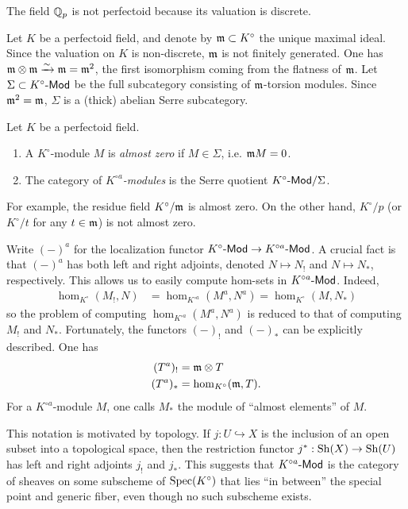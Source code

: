 \documentclass{article}
\begin{document}
\begin{example}
The field $\mathbb{Q}_p$ is not perfectoid because its valuation is discrete. 
\end{example}

Let $K$ be a perfectoid field, and denote by $\mathfrak{m}\subset K^\circ$ the unique 
maximal ideal. Since the valuation on $K$ is non-discrete, $\mathfrak{m}$ is not 
finitely generated. One has $\mathfrak{m}\otimes \mathfrak{m} \xrightarrow\sim \mathfrak{m} = \mathfrak{m}^2$, the 
first isomorphism coming from the flatness of $\mathfrak{m}$. Let 
$\Sigma\subset K^\circ\textnormal{-}\mathsf{Mod}$ be the full subcategory consisting of $\mathfrak{m}$-torsion 
modules. Since $\mathfrak{m}^2=\mathfrak{m}$, $\Sigma$ is a (thick) abelian Serre subcategory. 

\begin{definition} 
Let $K$ be a perfectoid field. 
\begin{enumerate}
  \item A $K^\circ$-module $M$ is \emph{almost zero} if $M\in\Sigma$, i.e. $\mathfrak{m} M=0$. 
  \item The category of \emph{$K^{\circ a}$-modules} is the Serre quotient 
    $K^\circ\textnormal{-}\mathsf{Mod} / \Sigma$. 
\end{enumerate}
\end{definition}

For example, the residue field $K^\circ/\mathfrak{m}$ is almost zero. On the other hand, 
$K^\circ/p$ (or $K^\circ / t$ for any $t\in \mathfrak{m}$) is not almost zero.

Write $(-)^a$ for the localization functor $K^\circ\textnormal{-}\mathsf{Mod} \to K^{\circ a}\textnormal{-}\mathsf{Mod}$. 
A crucial fact is that $(-)^a$ has both left and right adjoints, denoted 
$N\mapsto N_!$ and $N\mapsto N_\ast$, respectively. This allows us to easily 
compute hom-sets in $K^{\circ a}\textnormal{-}\mathsf{Mod}$. Indeed, 
\begin{align*}
  \hom_{K^\circ}(M_!,N) &= \hom_{K^{\circ a}}(M^a,N^a) = \hom_{K^\circ}(M,N_\ast)
\end{align*}
so the problem of computing $\hom_{K^{\circ a}}(M^a,N^a)$ is reduced to that 
of computing $M_!$ and $N_\ast$. Fortunately, the functors $(-)_!$ and 
$(-)_\ast$ can be explicitly described. One has 
\begin{align*}
  (T^a)_! &= \mathfrak{m}\otimes T \\
  (T^a)_\ast &= \hom_{K^\circ}(\mathfrak{m},T) .
\end{align*}
For a $K^{\circ a}$-module $M$, one calls $M_\ast$ the module of ``almost 
elements'' of $M$. 

This notation is motivated by topology. If $j:U\hookrightarrow X$ is the 
inclusion of an open subset into a topological space, then the restriction 
functor $j^\ast:\operatorname{Sh}(X) \to \operatorname{Sh}(U)$ has left and right adjoints 
$j_!$ and $j_\ast$. This suggests that $K^{\circ a}\textnormal{-}\mathsf{Mod}$ is the category 
of sheaves on some subscheme of $\operatorname{Spec}(K^\circ)$ that lies ``in between'' 
the special point and generic fiber, even though no such subscheme exists. 
\end{document}
